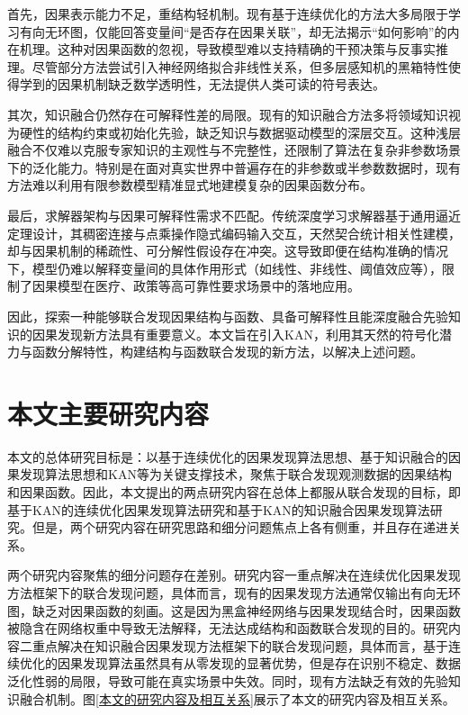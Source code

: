 首先，因果表示能力不足，重结构轻机制。现有基于连续优化的方法大多局限于学习有向无环图，仅能回答变量间“是否存在因果关联”，却无法揭示“如何影响”的内在机理。这种对因果函数的忽视，导致模型难以支持精确的干预决策与反事实推理。尽管部分方法尝试引入神经网络拟合非线性关系，但多层感知机的黑箱特性使得学到的因果机制缺乏数学透明性，无法提供人类可读的符号表达。

其次，知识融合仍然存在可解释性差的局限。现有的知识融合方法多将领域知识视为硬性的结构约束或初始化先验，缺乏知识与数据驱动模型的深层交互。这种浅层融合不仅难以克服专家知识的主观性与不完整性，还限制了算法在复杂非参数场景下的泛化能力。特别是在面对真实世界中普遍存在的非参数或半参数数据时，现有方法难以利用有限参数模型精准显式地建模复杂的因果函数分布。

最后，求解器架构与因果可解释性需求不匹配。传统深度学习求解器基于通用逼近定理设计，其稠密连接与点乘操作隐式编码输入交互，天然契合统计相关性建模，却与因果机制的稀疏性、可分解性假设存在冲突。这导致即便在结构准确的情况下，模型仍难以解释变量间的具体作用形式（如线性、非线性、阈值效应等），限制了因果模型在医疗、政策等高可靠性要求场景中的落地应用。

因此，探索一种能够联合发现因果结构与函数、具备可解释性且能深度融合先验知识的因果发现新方法具有重要意义。本文旨在引入KAN，利用其天然的符号化潜力与函数分解特性，构建结构与函数联合发现的新方法，以解决上述问题。


\section{本文主要研究内容}
\label{本文主要研究内容}
本文的总体研究目标是：以基于连续优化的因果发现算法思想、基于知识融合的因果发现算法思想和KAN等为关键支撑技术，聚焦于联合发现观测数据的因果结构和因果函数。因此，本文提出的两点研究内容在总体上都服从联合发现的目标，即基于KAN的连续优化因果发现算法研究和基于KAN的知识融合因果发现算法研究。但是，两个研究内容在研究思路和细分问题焦点上各有侧重，并且存在递进关系。

两个研究内容聚焦的细分问题存在差别。研究内容一重点解决在连续优化因果发现方法框架下的联合发现问题，具体而言，现有的因果发现方法通常仅输出有向无环图，缺乏对因果函数的刻画。这是因为黑盒神经网络与因果发现结合时，因果函数被隐含在网络权重中导致无法解释，无法达成结构和函数联合发现的目的。研究内容二重点解决在知识融合因果发现方法框架下的联合发现问题，具体而言，基于连续优化的因果发现算法虽然具有从零发现的显著优势，但是存在识别不稳定、数据泛化性弱的局限，导致可能在真实场景中失效。同时，现有方法缺乏有效的先验知识融合机制。图\ref{本文的研究内容及相互关系}展示了本文的研究内容及相互关系。

